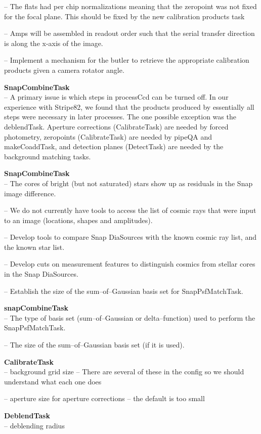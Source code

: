 \documentclass[12pt]{article}
\begin{document}
-- The flats had per chip normalizations meaning that the zeropoint was not fixed for the focal plane.  This should be
fixed by the new calibration products task

-- Amps will be assembled in readout order such that the serial transfer direction is along the x-axis of the image.

-- Implement a mechanism for the butler to retrieve the appropriate calibration products given a camera rotator angle.

{\bf SnapCombineTask}\\
-- A primary issue is which steps in processCcd can be turned off.  In our experience with Stripe82, we found that the products produced by
essentially all steps were necessary in later processes.  The one possible exception was the deblendTask.  Aperture corrections (CalibrateTask) 
are needed by forced photometry, zeropoints (CalibrateTask)
are needed by pipeQA and makeCoaddTask, and detection planes (DetectTask) are needed by the background matching tasks.


{\bf SnapCombineTask}\\
-- The cores of bright (but not saturated) stars show up as residuals
in the Snap image difference.

-- We do not currently have tools to access the list of cosmic rays
that were input to an image (locations, shapes and amplitudes).

-- Develop tools to compare Snap DiaSources with the known cosmic ray
list, and the known star list.

-- Develop cuts on measurement features to distinguish cosmics from
stellar cores in the Snap DiaSources.

-- Establish the size of the sum--of--Gaussian basis set for SnapPsfMatchTask.



{\bf snapCombineTask}\\
-- The type of basis set (sum--of--Gaussian or delta--function) used
to perform the SnapPsfMatchTask.

-- The size of the sum--of--Gaussian basis set (if it is used).

{\bf CalibrateTask}\\
-- background grid size -- There are several of these in the config
  so we should understand what each one does

-- aperture size for aperture corrections -- the default is too small

{\bf DeblendTask}\\
-- deblending radius
\end{document}
